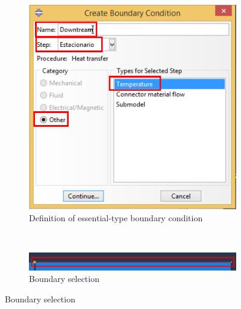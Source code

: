   \begin{figure}[!h]
    \centering
    \begin{subfigure}[!h]{0.42\textwidth}
      \includegraphics[width=\textwidth]{./body/images/load06.pdf}
      \caption{Definition of essential-type boundary condition}
      \label{load06}
    \end{subfigure}%
    ~ %
    \begin{subfigure}[!h]{0.55\textwidth}
      \includegraphics[width=\textwidth]{./body/images/load07.pdf}
      \caption{Boundary selection}
      \label{load07}
    \end{subfigure}%


\end{figure}
